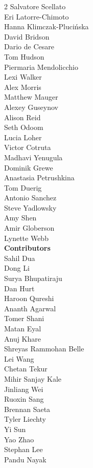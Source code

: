 \begin{multicols}{2}
Salvatore Scellato \\
Eri Latorre-Chimoto \\
Hanna Klimczak-Plucińska \\
David Bridson \\
Dario de Cesare \\
Tom Hudson \\
Piermaria Mendolicchio \\
Lexi Walker \\
Alex Morris \\
Matthew Mauger \\
Alexey Guseynov \\
Alison Reid \\
Seth Odoom \\
Lucia Loher \\
Victor Cotruta \\
Madhavi Yenugula \\
Dominik Grewe \\
Anastasia Petrushkina \\
Tom Duerig \\
Antonio Sanchez \\
Steve Yadlowsky \\
Amy Shen \\
Amir Globerson \\
Lynette Webb \\
\textbf{Contributors} \\
Sahil Dua \\
Dong Li \\
Surya Bhupatiraju \\
Dan Hurt \\
Haroon Qureshi \\
Ananth Agarwal \\
Tomer Shani \\
Matan Eyal \\
Anuj Khare \\
Shreyas Rammohan Belle \\
Lei Wang \\
Chetan Tekur \\
Mihir Sanjay Kale \\
Jinliang Wei \\
Ruoxin Sang \\
Brennan Saeta \\
Tyler Liechty \\
Yi Sun \\
Yao Zhao \\
Stephan Lee \\
Pandu Nayak \\

\end{multicols}
